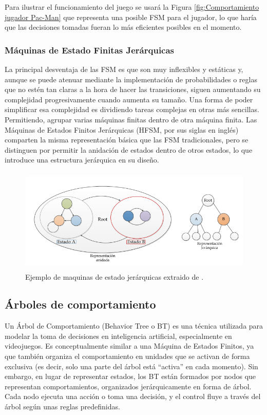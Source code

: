 Para ilustrar el funcionamiento del juego se usará la Figura \ref{fig:Comportamiento jugador Pac-Man} que representa una posible FSM para el jugador, lo que haría que las decisiones tomadas fueran lo más eficientes posibles en el momento.\\


\subsubsection{Máquinas de Estado Finitas Jerárquicas}

La principal desventaja de las FSM es que son muy inflexibles y estáticas y, aunque se puede atenuar mediante la implementación de probabilidades o reglas que no estén tan claras a la hora de hacer las transiciones, siguen aumentando su complejidad progresivamente cuando aumenta su tamaño. Una forma de poder simplificar esa complejidad es dividiendo tareas complejas en otras más sencillas. Permitiendo, agrupar varias máquinas finitas dentro de otra máquina finita. Las Máquinas de Estados Finitos Jerárquicas (HFSM, por sus siglas en inglés) comparten la misma representación básica que las FSM tradicionales, pero se distinguen por permitir la anidación de estados dentro de otros estados, lo que introduce una estructura jerárquica en su diseño.
\begin{figure}[h!]
	\centering
	\includegraphics[height=5cm]{Imagenes/HFSM.png}
	\caption{Ejemplo de maquinas de estado jerárquicas extraido de \cite{JorgeHFSM}.}
	\label{fig:Maquinas de estado jerárquicas}
\end{figure}

\subsection{Árboles de comportamiento}

Un Árbol de Comportamiento (Behavior Tree o BT) es una técnica utilizada para modelar la toma de decisiones en inteligencia artificial, especialmente en videojuegos. Es conceptualmente similar a una Máquina de Estados Finitos, ya que también organiza el comportamiento en unidades que se activan de forma exclusiva (es decir, solo una parte del árbol está ``activa'' en cada momento). Sin embargo, en lugar de representar estados, los BT están formados por nodos que representan comportamientos, organizados jerárquicamente en forma de árbol. Cada nodo ejecuta una acción o toma una decisión, y el control fluye a través del árbol según unas reglas predefinidas. \\


